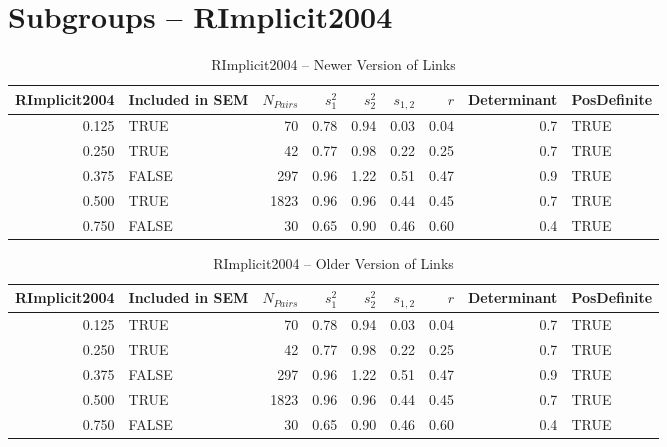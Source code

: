 \documentclass{article}\usepackage{graphicx, color}
\begin{document}
\section{Subgroups --  RImplicit2004 }%
\begin{table}[ht]
\begin{center}
\begin{tabular}{rlrrrrrrl}
  \hline
RImplicit2004 & Included in SEM & $N_{Pairs}$ & $s_1^2$ & $s_2^2$ & $s_{1,2}$ & $r$ & Determinant & PosDefinite \\ 
  \hline
0.125 & TRUE & 70 & 0.78 & 0.94 & 0.03 & 0.04 & 0.7 & TRUE \\ 
  0.250 & TRUE & 42 & 0.77 & 0.98 & 0.22 & 0.25 & 0.7 & TRUE \\ 
  0.375 & FALSE & 297 & 0.96 & 1.22 & 0.51 & 0.47 & 0.9 & TRUE \\ 
  0.500 & TRUE & 1823 & 0.96 & 0.96 & 0.44 & 0.45 & 0.7 & TRUE \\ 
  0.750 & FALSE & 30 & 0.65 & 0.90 & 0.46 & 0.60 & 0.4 & TRUE \\ 
   \hline
\end{tabular}
\caption{RImplicit2004 -- Newer Version of Links}
\end{center}
\end{table}
\begin{table}[ht]
\begin{center}
\begin{tabular}{rlrrrrrrl}
  \hline
RImplicit2004 & Included in SEM & $N_{Pairs}$ & $s_1^2$ & $s_2^2$ & $s_{1,2}$ & $r$ & Determinant & PosDefinite \\ 
  \hline
0.125 & TRUE & 70 & 0.78 & 0.94 & 0.03 & 0.04 & 0.7 & TRUE \\ 
  0.250 & TRUE & 42 & 0.77 & 0.98 & 0.22 & 0.25 & 0.7 & TRUE \\ 
  0.375 & FALSE & 297 & 0.96 & 1.22 & 0.51 & 0.47 & 0.9 & TRUE \\ 
  0.500 & TRUE & 1823 & 0.96 & 0.96 & 0.44 & 0.45 & 0.7 & TRUE \\ 
  0.750 & FALSE & 30 & 0.65 & 0.90 & 0.46 & 0.60 & 0.4 & TRUE \\ 
   \hline
\end{tabular}
\caption{RImplicit2004 -- Older Version of Links}
\end{center}
\end{table}
\end{document}
